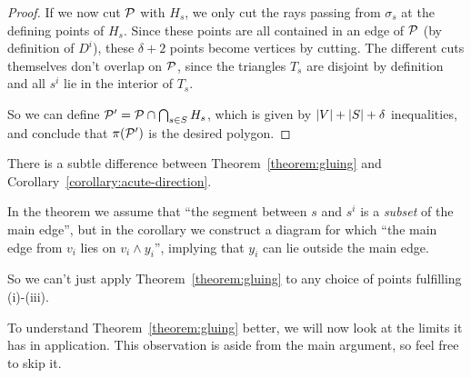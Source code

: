 \begin{proof}
  If we now cut $\P$ with $H_s$, we only cut the rays passing from $\sigma_s$ at the defining points of $H_s$. Since these points are all contained in an edge of $\P$ (by definition of $D^i$), these $\delta + 2$ points become vertices by cutting. The different cuts themselves don't overlap on $\P$, since the triangles $T_s$ are disjoint by definition and all $s^i$ lie in the interior of $T_s$.

  So we can define $\P' = \P \cap \bigcap_{s \in S} H_s$, which is given by $\abs{V}+\abs{S}+\delta$ inequalities, and conclude that $\pi(\P')$ is the desired polygon.
\end{proof}

\begin{remark}\label{remark:pitfall}
  There is a subtle difference between Theorem~\ref{theorem:gluing} and Corollary~\ref{corollary:acute-direction}.

  In the theorem we assume that ``the segment between $s$ and $s^i$ is a \emph{subset} of the main edge'', but in the corollary we construct a diagram for which ``the main edge from $v_i$ lies on $v_i \wedge y_i$'', implying that $y_i$ can lie outside the main edge. 

  So we can't just apply Theorem~\ref{theorem:gluing} to any choice of points fulfilling (i)-(iii).
\end{remark}

To understand Theorem~\ref{theorem:gluing} better, we will now look at the limits it has in application. This observation is aside from the main argument, so feel free to skip it.


